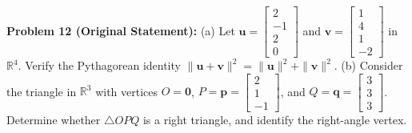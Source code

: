 \documentclass[11pt, letterpaper]{article}
\theoremstyle{definition}
\theoremstyle{remark}
\begin{document}
\medskip
\textbf{Problem 12 (Original Statement):} (a) Let $\mathbf{u} = \begin{bmatrix} 2 \\ -1 \\ 2 \\ 0 \end{bmatrix}$ and $\mathbf{v} = \begin{bmatrix} 1 \\ 4 \\ 1 \\ -2 \end{bmatrix}$ in $\mathbb{R}^4$. Verify the Pythagorean identity $\|\mathbf{u} + \mathbf{v}\|^2 = \|\mathbf{u}\|^2 + \|\mathbf{v}\|^2$. (b) Consider the triangle in $\mathbb{R}^3$ with vertices $O = \mathbf{0}$, $P = \mathbf{p} = \begin{bmatrix} 2 \\ 1 \\ -1 \end{bmatrix}$, and $Q = \mathbf{q} = \begin{bmatrix} 3 \\ 3 \\ 3 \end{bmatrix}$. Determine whether $\triangle OPQ$ is a right triangle, and identify the right-angle vertex.
\end{document}
